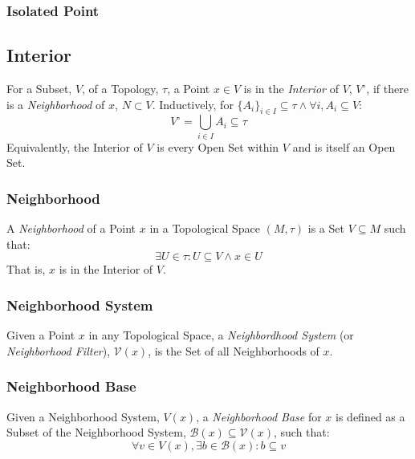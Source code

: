 \documentclass{article}
\begin{document}
\subsubsection{Isolated Point}\label{subsec:isolated_point}



\subsection{Interior}\label{subsec:interior}

For a Subset, $V$, of a Topology, $\tau$, a Point $x \in V$ is in the
\emph{Interior} of $V$, $V^{\circ}$, if there is a \emph{Neighborhood}
of $x$, $N \subset V$. Inductively, for $\{A_i\}_{i \in I} \subseteq
\tau \wedge \forall i, A_i \subseteq V$:
\[
    V^{\circ} = \bigcup_{i \in I} A_i \subseteq \tau
\]
Equivalently, the Interior of $V$ is every Open Set within $V$ and is
itself an Open Set.



\subsubsection{Neighborhood}\label{subsec:neighborhood}

A \emph{Neighborhood} of a Point $x$ in a Topological Space $(M,\tau)$
is a Set $V \subseteq M$ such that:
\[
    \exists U \in \tau : U \subseteq V \wedge x \in U
\]
That is, $x$ is in the Interior of $V$.



\subsubsection{Neighborhood System}\label{subsec:neighborhood_system}

Given a Point $x$ in any Topological Space, a \emph{Neighbordhood
  System} (or \emph{Neighborhood Filter}), $\mathcal{V}(x)$, is the
Set of all Neighborhoods of $x$.



\subsubsection{Neighborhood Base}\label{subsec:neighborhood_base}

Given a Neighborhood System, $V(x)$, a \emph{Neighborhood Base} for
$x$ is defined as a Subset of the Neighborhood System, $\mathcal{B}(x)
\subseteq \mathcal{V}(x)$, such that:
\[
    \forall v \in V(x), \exists b \in \mathcal{B}(x) : b \subseteq v
\]
\end{document}
